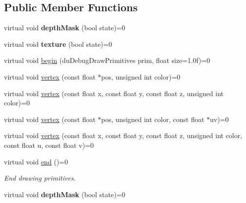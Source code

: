 \subsection*{Public Member Functions}
\begin{DoxyCompactItemize}
\item 
\mbox{\label{structduDebugDraw_aac0f17039f76220b14b2bdce7e26f521}} 
virtual void {\bfseries depth\+Mask} (bool state)=0
\item 
\mbox{\label{structduDebugDraw_afd70102a49177ea8068508139c8cdb1e}} 
virtual void {\bfseries texture} (bool state)=0
\item 
virtual void \hyperlink{structduDebugDraw_a6403932173f27503e05cd258f5837d17}{begin} (du\+Debug\+Draw\+Primitives prim, float size=1.\+0f)=0
\item 
virtual void \hyperlink{structduDebugDraw_a8fac1072846b60be4ce4810c68140ee8}{vertex} (const float $\ast$pos, unsigned int color)=0
\item 
virtual void \hyperlink{structduDebugDraw_a2af291d6e63081ce1d3f34e1851ae5e0}{vertex} (const float x, const float y, const float z, unsigned int color)=0
\item 
virtual void \hyperlink{structduDebugDraw_a711146a2e4be2ef9e0d6de7be8c714bc}{vertex} (const float $\ast$pos, unsigned int color, const float $\ast$uv)=0
\item 
virtual void \hyperlink{structduDebugDraw_a0f76c61eb9f274f17c91308c739211eb}{vertex} (const float x, const float y, const float z, unsigned int color, const float u, const float v)=0
\item 
\mbox{\label{structduDebugDraw_ac699459669944f2f950bbf972fe62a14}} 
virtual void \hyperlink{structduDebugDraw_ac699459669944f2f950bbf972fe62a14}{end} ()=0
\begin{DoxyCompactList}\small\item\em End drawing primitives. \end{DoxyCompactList}\item 
\mbox{\label{structduDebugDraw_aac0f17039f76220b14b2bdce7e26f521}} 
virtual void {\bfseries depth\+Mask} (bool state)=0
\item 
\mbox{\label{structduDebugDraw_afd70102a49177ea8068508139c8cdb1e}} 

\end{DoxyCompactItemize}
